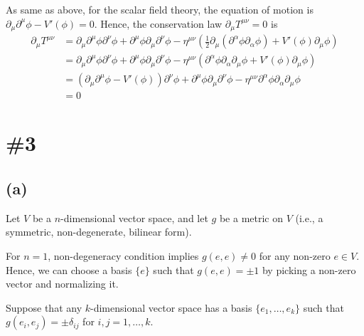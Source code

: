 \documentclass[a4paper,11pt]{article}
\begin{document}
As same as above, for the scalar field theory, the equation of motion is $\partial_\mu \partial^\mu \phi - V'(\phi) = 0$. Hence, the conservation law $\partial_\mu T^{\mu\nu} = 0$ is
\begin{align}
    \partial_\mu T^{\mu\nu} &= \partial_\mu \partial^\mu \phi \partial^\nu \phi + \partial^\mu \phi \partial_\mu \partial^\nu \phi - \eta^{\mu\nu}\left(\frac{1}{2}\partial_\mu(\partial^\alpha \phi \partial_\alpha \phi) + V'(\phi)\partial_\mu\phi\right)\\
    &= \partial_\mu \partial^\mu \phi \partial^\nu \phi + \partial^\mu \phi \partial_\mu \partial^\nu \phi - \eta^{\mu\nu}\left(\partial^\alpha \phi \partial_\alpha \partial_\mu\phi + V'(\phi)\partial_\mu\phi\right)\\
    &= (\partial_\mu \partial^\mu \phi - V'(\phi))\partial^\nu \phi + \partial^\mu \phi \partial_\mu \partial^\nu \phi - \eta^{\mu\nu}\partial^\alpha \phi \partial_\alpha \partial_\mu\phi\\
    &= 0
\end{align}


\section{\#3}

\subsection{(a)}

Let $V$ be a $n$-dimensional vector space, and let $g$ be a metric on $V$ (i.e., a symmetric, non-degenerate, bilinear form).



For $n=1$, non-degeneracy condition implies $g(e, e) \ne 0$ for any non-zero $e\in V$. Hence, we can choose a basis $\{e\}$ such that $g(e, e) = \pm1$ by picking a non-zero vector and normalizing it.


Suppose that any $k$-dimensional vector space has a basis $\{e_1, \dots, e_k\}$ such that $g(e_i, e_j) = \pm\delta_{ij}$ for $i, j = 1, \dots, k$.
\end{document}
